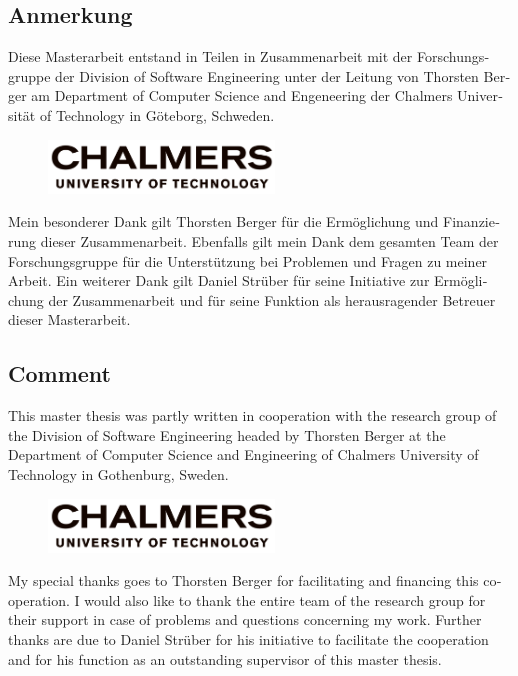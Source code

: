 
\begin{otherlanguage}{ngerman}
    \section*{Anmerkung}

Diese Masterarbeit entstand in Teilen in Zusammenarbeit mit der Forschungsgruppe der Division of Software Engineering unter der Leitung von Thorsten Berger am Department of Computer Science and Engeneering der Chalmers Universität of Technology in Göteborg, Schweden.

\begin{figure}[H]
    \centering
    \includegraphics[width=6cm]{logos/chalmers}
\end{figure}

Mein besonderer Dank gilt Thorsten Berger für die Ermöglichung und Finanzierung dieser Zusammenarbeit. Ebenfalls gilt mein Dank dem gesamten Team der Forschungsgruppe für die Unterstützung bei Problemen und Fragen zu meiner Arbeit. Ein weiterer Dank gilt Daniel Strüber für seine Initiative zur Ermöglichung der Zusammenarbeit und für seine Funktion als herausragender Betreuer dieser Masterarbeit.

\end{otherlanguage}

\begin{otherlanguage}{english}
    \section*{Comment}

This master thesis was partly written in cooperation with the research group of the Division of Software Engineering headed by Thorsten Berger at the Department of Computer Science and Engineering of Chalmers University of Technology in Gothenburg, Sweden.

\begin{figure}[H]
    \centering
    \includegraphics[width=6cm]{logos/chalmers}
\end{figure}

My special thanks goes to Thorsten Berger for facilitating and financing this cooperation. I would also like to thank the entire team of the research group for their support in case of problems and questions concerning my work. Further thanks are due to Daniel Strüber for his initiative to facilitate the cooperation and for his function as an outstanding supervisor of this master thesis.

\end{otherlanguage}
\cleardoublepage